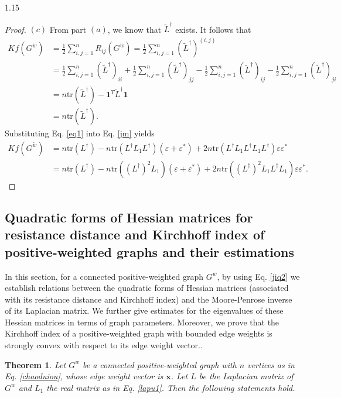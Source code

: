 \documentclass[preprint,12pt]{elsarticle1}
\newtheorem{thm}{Theorem}[section]
\numberwithin{equation}{section}
\begin{document}
\begin{spacing}{1.15}
\begin{proof}
$(c)$ From part $(a)$, we know that $\widetilde{L}^{\dag}$ exists.  It follows that
\begin{align}\nonumber
Kf(G^{\widetilde{w}})&=\frac{1}{2}\sum_{i,j=1}^{n}R_{ij}(G^{\widetilde{w}})
=\frac{1}{2}\sum_{i,j=1}^{n}
(\widetilde{L}^{\dag})^{(i,j)}\\ \nonumber
&=\frac{1}{2}\sum_{i,j=1}^{n}(\widetilde{L}^{\dag})_{ii}+
\frac{1}{2}\sum_{i,j=1}^{n}(\widetilde{L}^{\dag})_{jj}
-\frac{1}{2}\sum_{i,j=1}^{n}(\widetilde{L}^{\dag})_{ij}
-\frac{1}{2}\sum_{i,j=1}^{n}(\widetilde{L}^{\dag})_{ji}\\ \nonumber
&=n \textrm{tr}(\widetilde{L}^{\dag})-
\textbf{1}^{T}\widetilde{L}^{\dag}\textbf{1}\\
\label{jm}
&=n \textrm{tr}(\widetilde{L}^{\dag}).
\end{align}
Substituting Eq. \eqref{eq1} into Eq. \eqref{jm} yields
\begin{align}\nonumber Kf(G^{\widetilde{w}})
&=n\textrm{tr}(L^{\dag})-n\textrm{tr}(L^{\dag}L_{1}L^{\dag})
(\varepsilon+\varepsilon^{*})
+2n\textrm{tr}(L^{\dag}L_{1}L^{\dag}L_{1}L^{\dag})
\varepsilon\varepsilon^{*}\\ \nonumber
&=n\textrm{tr}(L^{\dag})
-n\textrm{tr}((L^{\dag})^{2}L_{1})
(\varepsilon+\varepsilon^{*})
+2n\textrm{tr}((L^{\dag})^{2}L_{1}L^{\dag}L_{1})
\varepsilon\varepsilon^{*}.\end{align}
\end{proof}



\subsection{Quadratic forms of Hessian matrices for resistance distance and Kirchhoff index of  positive-weighted graphs and their
 estimations}
In this section, for a  connected  positive-weighted graph $G^{w}$, by using Eq. \eqref{jiq2} we
 establish relations between the quadratic forms of Hessian matrices (associated with its resistance distance and Kirchhoff index) and the Moore-Penrose inverse of its Laplacian
matrix. We further give estimates for the eigenvalues of these Hessian matrices in terms of graph parameters. Moreover, we prove that the Kirchhoff index
 of a  positive-weighted graph with bounded edge weights is strongly convex with respect to its edge weight vector..

\begin{thm}\label{ciio} Let $G^{w}$ be a connected  positive-weighted graph with $n$ vertices as in Eq. \eqref{chaoduiou}, whose edge weight vector is $\mathbf{x}$. Let $L$ be the Laplacian matrix of $G^{w}$ and $L_{1}$ the real matrix as in Eq. \eqref{lapu1}.
 Then the following statements hold.


\end{thm}
\end{spacing}
\end{document}
